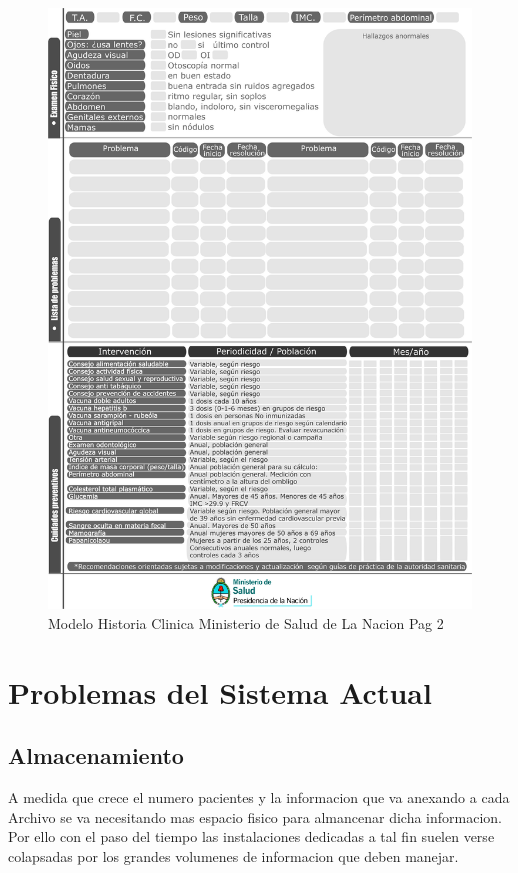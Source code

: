 \begin{figure}[H]
    \centering
    \includegraphics[scale=0.7]{resourse/historia-clinica-d.jpg}
    \caption{Modelo Historia Clinica Ministerio de Salud de La Nacion Pag 2}
    \label{fig:07}
\end{figure}

\section{Problemas del Sistema Actual}


\subsection{Almacenamiento}
 A medida que crece el numero pacientes y la informacion que va
anexando a cada Archivo se va necesitando mas espacio fisico para almancenar
dicha informacion. Por ello con el paso del tiempo las instalaciones dedicadas
a tal fin suelen verse colapsadas por los grandes volumenes de informacion que
deben manejar.\\[0.1cm]

